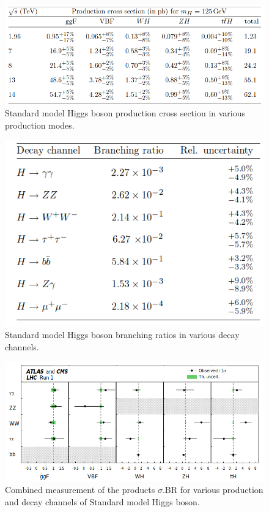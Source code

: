 \documentclass[final,3p]{CSP}
\begin{document}
\begin{figure}
  \centering
   \includegraphics[width=\columnwidth]{./cd1.png}
  \caption{Standard model Higgs boson production cross section in various production modes.}
   \label{figure 12}
\end{figure}

\begin{figure}
  \centering
   \includegraphics[scale=0.5]{./cd3.png}
  \caption{Standard model Higgs boson branching ratios in various decay channels.}
   \label{figure 14}
\end{figure}


\begin{figure}
  \centering
   \includegraphics[width=\columnwidth]{./cd5.png}
  \caption{Combined measurement of the products $\sigma$.BR for various production and decay channels of Standard model Higgs boson.}
   \label{figure 15}
\end{figure}
\end{document}
